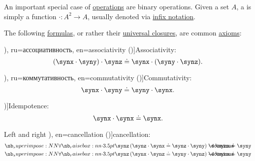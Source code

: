 \begin{definition}\label{def:binary_operation}
  An important special case of \hyperref[def:operation_on_set]{operations} are binary operations. Given a set \( A \), a  is simply a function \( \cdot: A^2 \to A \), usually denoted via \hyperref[rem:first_order_formula_conventions/infix]{infix notation}.

  The following \hyperref[def:first_order_syntax/formula]{formulas}, or rather their \hyperref[def:universal_closure]{universal closures}, are common \hyperref[def:first_order_theory/axiomatized]{axioms}:
  \begin{thmenum}
     \term[bg=асоциативност (\cite[11]{ГеновМиховскиМоллов1991Алгебра}), ru=ассоциативность, en=associativity (\cite[329]{RosenEtAl2018DiscreteMathematicsHandbook})]{Associativity}:
    \begin{equation}\label{eq:def:binary_operation/associative}
      (\synx \cdot \syny) \cdot \synz \syneq \synx \cdot (\syny \cdot \synz).
    \end{equation}

     \term[bg=комутативност (\cite[11]{ГеновМиховскиМоллов1991Алгебра}), ru=коммутативность, en=commutativity (\cite[329]{RosenEtAl2018DiscreteMathematicsHandbook})]{Commutativity}:
    \begin{equation}\label{eq:def:binary_operation/commutative}
      \synx \cdot \syny \syneq \syny \cdot \synx.
    \end{equation}

     \term[ru=идемпотентность, en=idempotence (\cite[33]{RosenEtAl2018DiscreteMathematicsHandbook})]{Idempotence}:
    \begin{equation}\label{eq:def:binary_operation/idempotent}
      \synx \cdot \synx \syneq \synx.
    \end{equation}

     Left and right \term[ru=сокращение, bg=съкращаване (\cite[77]{ГеновМиховскиМоллов1991Алгебра}), en=cancellation (\cite[324]{RosenEtAl2018DiscreteMathematicsHandbook})]{cancellation}:
    \begin{align}
      \qforall \synz (\synz \cdot \synx \syneq \synz \cdot \syny) \synimplies \synx \syneq \syny
      \label{eq:def:binary_operation/cancellative/left}
      \\
      \qforall \synz (\synx \cdot \synz \syneq \syny \cdot \synz) \synimplies \synx \syneq \syny
      \label{eq:def:binary_operation/cancellative/right}
    \end{align}
  \end{thmenum}
\end{definition}

